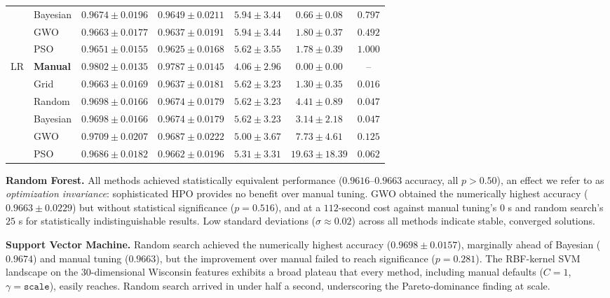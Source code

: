 \documentclass[letterpaper, 10 pt, conference]{ieeeconf}
\begin{document}
\begin{table}[t]
\begin{tabular}{|l|l|c|c|c|c|c|}
		& Bayesian & $0.9674 \pm 0.0196$ & $0.9649 \pm 0.0211$ & $5.94 \pm 3.44$ & $0.66 \pm 0.08$ & $0.797$ \\
		& GWO      & $0.9663 \pm 0.0177$ & $0.9637 \pm 0.0191$ & $5.94 \pm 3.44$ & $1.80 \pm 0.37$ & $0.492$ \\
		& PSO      & $0.9651 \pm 0.0155$ & $0.9625 \pm 0.0168$ & $5.62 \pm 3.55$ & $1.78 \pm 0.39$ & $1.000$ \\
		\hline
		\multirow{6}{*}{LR}
		& \textbf{Manual}   & $\mathbf{0.9802 \pm 0.0135}$ & $\mathbf{0.9787 \pm 0.0145}$ & $\mathbf{4.06 \pm 2.96}$ & $0.00 \pm 0.00$ & -- \\
		& Grid     & $0.9663 \pm 0.0169$ & $0.9637 \pm 0.0181$ & $5.62 \pm 3.23$ & $1.30 \pm 0.35$ & $0.016$ \\
		& Random   & $0.9698 \pm 0.0166$ & $0.9674 \pm 0.0179$ & $5.62 \pm 3.23$ & $4.41 \pm 0.89$ & $0.047$ \\
		& Bayesian & $0.9698 \pm 0.0166$ & $0.9674 \pm 0.0179$ & $5.62 \pm 3.23$ & $3.14 \pm 2.18$ & $0.047$ \\
		& GWO      & $0.9709 \pm 0.0207$ & $0.9687 \pm 0.0222$ & $5.00 \pm 3.67$ & $7.73 \pm 4.61$ & $0.125$ \\
		& PSO      & $0.9686 \pm 0.0182$ & $0.9662 \pm 0.0196$ & $5.31 \pm 3.31$ & $19.63 \pm 18.39$ & $0.062$ \\
		\hline
	\end{tabular}
\end{table}

\textbf{Random Forest.} All methods achieved statistically equivalent performance ($0.9616$--$0.9663$ accuracy, all $p > 0.50$), an effect we refer to as \emph{optimization invariance}: sophisticated HPO provides no benefit over manual tuning. GWO obtained the numerically highest accuracy ($0.9663 \pm 0.0229$) but without statistical significance ($p = 0.516$), and at a $112$-second cost against manual tuning's $0$ s and random search's $25$ s for statistically indistinguishable results. Low standard deviations ($\sigma \approx 0.02$) across all methods indicate stable, converged solutions.

\textbf{Support Vector Machine.} Random search achieved the numerically highest accuracy ($0.9698 \pm 0.0157$), marginally ahead of Bayesian ($0.9674$) and manual tuning ($0.9663$), but the improvement over manual failed to reach significance ($p = 0.281$). The RBF-kernel SVM landscape on the $30$-dimensional Wisconsin features exhibits a broad plateau that every method, including manual defaults ($C = 1$, $\gamma = \texttt{scale}$), easily reaches. Random search arrived in under half a second, underscoring the Pareto-dominance finding at scale.
\end{document}
